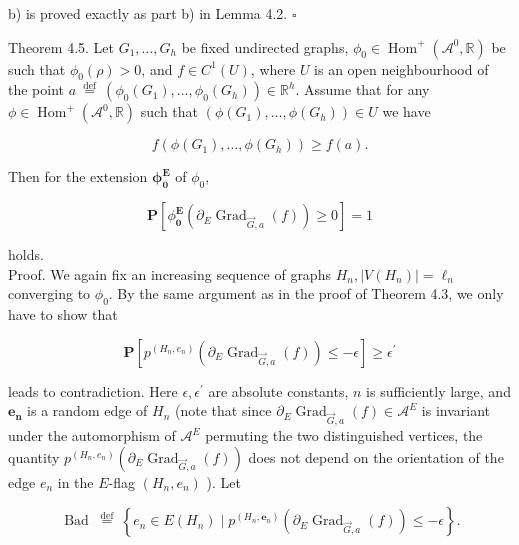 \documentclass[10pt]{article}
\begin{document}
b) is proved exactly as part b) in Lemma 4.2. \(\square\)

Theorem 4.5. Let $G_{1}, \ldots, G_{h}$ be fixed undirected graphs, $\phi_{0} \in \operatorname{Hom}^{+}\left(\mathcal{A}^{0}, \mathbb{R}\right)$ be such that $\phi_{0}(\rho)>0$, and $f \in C^{1}(U)$, where $U$ is an open neighbourhood of the point $a \stackrel{\text { def }}{=}\left(\phi_{0}\left(G_{1}\right), \ldots, \phi_{0}\left(G_{h}\right)\right) \in \mathbb{R}^{h}$. Assume that for any $\phi \in \operatorname{Hom}^{+}\left(\mathcal{A}^{0}, \mathbb{R}\right)$ such that $\left(\phi\left(G_{1}\right), \ldots, \phi\left(G_{h}\right)\right) \in U$ we have

$$
f\left(\phi\left(G_{1}\right), \ldots, \phi\left(G_{h}\right)\right) \geq f(a) .
$$

Then for the extension $\boldsymbol{\phi}_{\mathbf{0}}^{\boldsymbol{E}}$ of $\phi_{0}$,


\begin{equation*}
\mathbf{P}\left[\phi_{\mathbf{0}}^{\boldsymbol{E}}\left(\partial_{E} \operatorname{Grad}_{\vec{G}, a}(f)\right) \geq 0\right]=1 \tag{34}
\end{equation*}


holds.\\
Proof. We again fix an increasing sequence of graphs $H_{n},\left|V\left(H_{n}\right)\right|=\ell_{n}$ converging to $\phi_{0}$. By the same argument as in the proof of Theorem 4.3, we only have to show that

$$
\mathbf{P}\left[p^{\left(H_{n}, e_{n}\right)}\left(\partial_{E} \operatorname{Grad}_{\vec{G}, a}(f)\right) \leq-\epsilon\right] \geq \epsilon^{\prime}
$$

leads to contradiction. Here $\epsilon, \epsilon^{\prime}$ are absolute constants, $n$ is sufficiently large, and $\boldsymbol{e}_{\boldsymbol{n}}$ is a random edge of $H_{n}$ (note that since $\partial_{E} \operatorname{Grad}_{\vec{G}, a}(f) \in \mathcal{A}^{E}$ is invariant under the automorphism of $\mathcal{A}^{E}$ permuting the two distinguished vertices, the quantity $p^{\left(H_{n}, e_{n}\right)}\left(\partial_{E} \operatorname{Grad}_{\vec{G}, a}(f)\right)$ does not depend on the orientation of the edge $e_{n}$ in the $E$-flag $\left(H_{n}, e_{n}\right)$ ). Let

$$
\text { Bad } \stackrel{\text { def }}{=}\left\{e_{n} \in E\left(H_{n}\right) \mid p^{\left(H_{n}, \boldsymbol{e}_{n}\right)}\left(\partial_{E} \operatorname{Grad}_{\vec{G}, a}(f)\right) \leq-\epsilon\right\} .
$$
\end{document}
